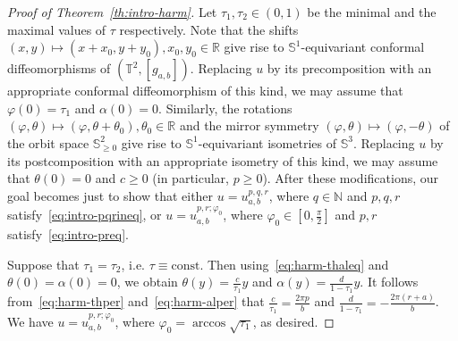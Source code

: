 \documentclass{amsart}
\let\ge\geqslant
\let\phi\varphi
\newcommand{\const}{\mathrm{const}}
\theoremstyle{plain}
\theoremstyle{definition}
\theoremstyle{remark}
\begin{document}
\begin{proof}[Proof of Theorem~\ref{th:intro-harm}]
Let \(\tau_1,\tau_2\in (0,1)\) be the minimal and the maximal values of \(\tau\)
respectively. Note that the shifts \((x,y)\mapsto
(x+x_0,y+y_0),x_0,y_0\in\mathbb R\) give rise to \(\mathbb S^1\)-equivariant
conformal diffeomorphisms of \((\mathbb T^2,[g_{a,b}])\). Replacing \(u\) by its
precomposition with an appropriate conformal diffeomorphism of this kind, we may
assume that \(\phi(0)=\tau_1\) and \(\alpha(0)=0\). Similarly, the rotations
\((\phi,\theta)\mapsto (\phi,\theta+\theta_0),\theta_0\in\mathbb R\) and the
mirror symmetry \((\phi,\theta)\mapsto (\phi,-\theta)\) of the orbit space
\(\mathbb S_{\ge 0}^2\) give rise to \(\mathbb S^1\)-equivariant isometries of
\(\mathbb S^3\). Replacing \(u\) by its postcomposition with an appropriate
isometry of this kind, we may assume that \(\theta(0)=0\) and \(c\ge 0\) (in
particular, \(p\ge 0\)). After these modifications, our goal becomes just to
show that either \(u=u_{a,b}^{p,q,r}\), where \(q\in\mathbb N\) and \(p,q,r\)
satisfy~\eqref{eq:intro-pqrineq}, or \(u=u_{a,b}^{p,r;\phi_0}\), where
\(\phi_0\in\left[0,\frac{\pi}2\right]\) and \(p,r\)
satisfy~\eqref{eq:intro-preq}.

Suppose that \(\tau_1=\tau_2\), i.e. \(\tau\equiv\const\). Then
using~\eqref{eq:harm-thaleq} and \(\theta(0)=\alpha(0)=0\), we obtain
\(\theta(y)=\frac{c}{\tau_1}y\) and \(\alpha(y)=\frac{d}{1-\tau_1}y\). It
follows from~\eqref{eq:harm-thper} and~\eqref{eq:harm-alper} that
\(\frac{c}{\tau_1}=\frac{2\pi p}b\) and
\(\frac{d}{1-\tau_1}=-\frac{2\pi(r+a)}b\). We have \(u=u_{a,b}^{p,r;\phi_0}\),
where \(\phi_0=\arccos\sqrt{\tau_1}\), as desired.


\end{proof}
\end{document}
